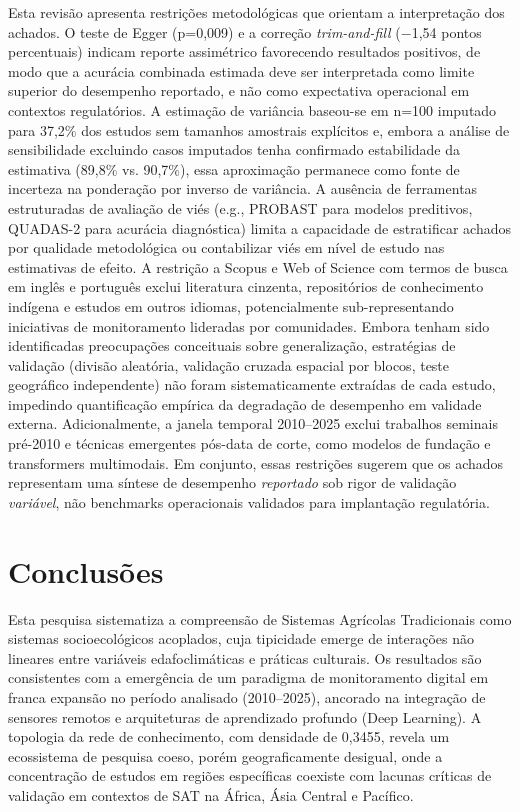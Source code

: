 Esta revisão apresenta restrições metodológicas que orientam a interpretação dos achados. O teste de Egger (p=0,009) e a correção \textit{trim-and-fill} ($-$1,54 pontos percentuais) indicam reporte assimétrico favorecendo resultados positivos, de modo que a acurácia combinada estimada deve ser interpretada como limite superior do desempenho reportado, e não como expectativa operacional em contextos regulatórios. A estimação de variância baseou-se em n=100 imputado para 37,2\% dos estudos sem tamanhos amostrais explícitos e, embora a análise de sensibilidade excluindo casos imputados tenha confirmado estabilidade da estimativa (89,8\% vs. 90,7\%), essa aproximação permanece como fonte de incerteza na ponderação por inverso de variância. A ausência de ferramentas estruturadas de avaliação de viés (e.g., PROBAST para modelos preditivos, QUADAS-2 para acurácia diagnóstica) limita a capacidade de estratificar achados por qualidade metodológica ou contabilizar viés em nível de estudo nas estimativas de efeito. A restrição a Scopus e Web of Science com termos de busca em inglês e português exclui literatura cinzenta, repositórios de conhecimento indígena e estudos em outros idiomas, potencialmente sub-representando iniciativas de monitoramento lideradas por comunidades. Embora tenham sido identificadas preocupações conceituais sobre generalização, estratégias de validação (divisão aleatória, validação cruzada espacial por blocos, teste geográfico independente) não foram sistematicamente extraídas de cada estudo, impedindo quantificação empírica da degradação de desempenho em validade externa. Adicionalmente, a janela temporal 2010--2025 exclui trabalhos seminais pré-2010 e técnicas emergentes pós-data de corte, como modelos de fundação e transformers multimodais. Em conjunto, essas restrições sugerem que os achados representam uma síntese de desempenho \textit{reportado} sob rigor de validação \textit{variável}, não benchmarks operacionais validados para implantação regulatória. 

\section[Conclusoes]{Conclusões}

Esta pesquisa sistematiza a compreensão de Sistemas Agrícolas Tradicionais como sistemas socioecológicos acoplados, cuja tipicidade emerge de interações não lineares entre variáveis edafoclimáticas e práticas culturais. Os resultados são consistentes com a emergência de um paradigma de monitoramento digital em franca expansão no período analisado (2010--2025), ancorado na integração de sensores remotos e arquiteturas de aprendizado profundo (Deep Learning). A topologia da rede de conhecimento, com densidade de 0,3455, revela um ecossistema de pesquisa coeso, porém geograficamente desigual, onde a concentração de estudos em regiões específicas coexiste com lacunas críticas de validação em contextos de SAT na África, Ásia Central e Pacífico.


